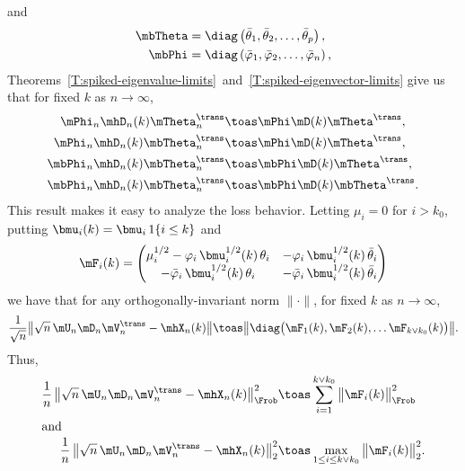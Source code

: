 and
\begin{align*}
    \mbTheta
        &=
            \diag\left(
                \bar \theta_1,
                \bar \theta_2,
                \ldots,
                \bar \theta_p
            \right), \\
    \mbPhi
        &=
            \diag\left(
                \bar \varphi_1,
                \bar \varphi_2,
                \ldots,
                \bar \varphi_n
            \right),
\end{align*}
Theorems~\ref{T:spiked-eigenvalue-limits}~and~\ref{T:spiked-eigenvector-limits}
give us that for fixed $k$ as $n \to \infty$,
\begin{align*}
    \mPhi_n \mhD_n(k) \mTheta_n^\trans
        &\toas
            \mPhi \mD(k) \mTheta^\trans, \\
    \mPhi_n \mhD_n(k) \mbTheta_n^\trans
        &\toas
            \mPhi \mD(k) \mTheta^\trans, \\
    \mbPhi_n \mhD_n(k) \mbTheta_n^\trans
        &\toas
            \mbPhi \mD(k) \mTheta^\trans, \\
    \mbPhi_n \mhD_n(k) \mbTheta_n^\trans
        &\toas
            \mbPhi \mD(k) \mbTheta^\trans.
\end{align*}
This result makes it easy to analyze the loss behavior.  Letting $\mu_i = 0$
for $i > k_0$, putting $\bmu_i(k) = \bmu_i \, 1\{i \leq k\}$ and
\[
    \mF_i(k)
        =
            \left(
            \begin{matrix}
                \mu_i^{1/2} - \varphi_i \, \bmu_i^{1/2}(k) \, \theta_i &
                    -\varphi_i \, \bmu_i^{1/2}(k) \, \bar \theta_i \\
                -\bar \varphi_i \, \bmu_i^{1/2}(k) \, \theta_i &
                    -\bar \varphi_i \, \bmu_i^{1/2}(k) \, \bar \theta_i
            \end{matrix}
            \right)
\]
we have that for any orthogonally-invariant norm $\| \cdot \|$, for
fixed $k$ as $n\to \infty$,
\[
    \frac{1}{\sqrt{n}}
    \big\| \sqrt{n} \, \mU_n \mD_n \mV_n^\trans - \mhX_n(k) \big\|
        \toas
            \big\|
                \diag \big(
                    \mF_1(k),
                    \mF_2(k),
                    \ldots
                    \mF_{k \vee k_0}(k)
                \big) \big\|.
\]
Thus,
\begin{align*}
    \frac{1}{n} \,
    \big\| \sqrt{n} \, \mU_n \mD_n \mV_n^\trans - \mhX_n(k) \big\|_\Frob^2
        &\toas
            \sum_{i=1}^{k \vee k_0}
                \big\| \mF_i(k) \big\|_\Frob^2 \\
\intertext{and}
    \frac{1}{n} \,
    \big\| \sqrt{n} \, \mU_n \mD_n \mV_n^\trans - \mhX_n(k) \big\|_2^2
        &\toas
            \max_{1 \leq i \leq k \vee k_0}
                \big\| \mF_i(k) \big\|_2^2.
\end{align*}
